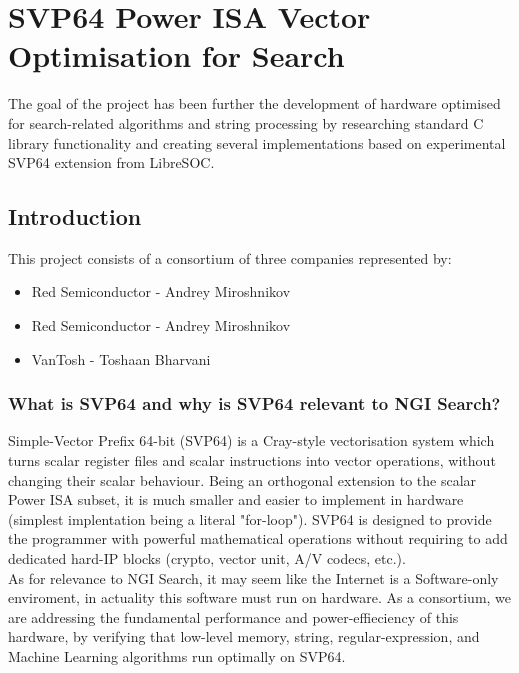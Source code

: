 \chapter{SVP64 Power ISA Vector Optimisation for Search}

The goal of the project has been further the development of hardware
optimised for search-related algorithms and string processing by
researching standard C library functionality and creating several
implementations based on experimental SVP64 extension from LibreSOC.

\section{Introduction}

This project consists of a consortium of three companies represented by:

\begin{itemize}
  \item Red Semiconductor - Andrey Miroshnikov
  \item Red Semiconductor - Andrey Miroshnikov
  \item VanTosh - Toshaan Bharvani
\end{itemize}

\subsection{What is SVP64 and why is SVP64 relevant to NGI Search?}

Simple-Vector Prefix 64-bit (SVP64) is a Cray-style vectorisation system which
turns scalar register files and scalar instructions into vector operations,
without changing their scalar behaviour. Being an orthogonal extension to the
scalar Power ISA subset, it is much smaller and easier to implement in
hardware (simplest implentation being a literal "for-loop"). SVP64 is
designed to provide the programmer with powerful mathematical operations
without requiring to add dedicated hard-IP blocks (crypto, vector unit, A/V
codecs, etc.).\\

As for relevance to NGI Search, it may seem like the Internet is a
Software-only enviroment, in actuality this software must run on hardware.
As a consortium, we are addressing the fundamental performance and
power-effieciency of this hardware, by verifying that low-level memory,
string, regular-expression, and Machine Learning algorithms run optimally
on SVP64.\\


